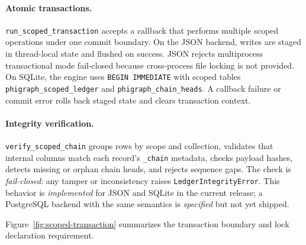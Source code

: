 \documentclass[11pt]{article}
\begin{document}
\paragraph{Atomic transactions.}
\texttt{run\_scoped\_transaction} accepts a callback that performs multiple
scoped operations under one commit boundary. On the JSON backend, writes are
staged in thread-local state and flushed on success. JSON rejects multiprocess
transactional mode fail-closed because cross-process file locking is not
provided. On SQLite, the engine uses \texttt{BEGIN IMMEDIATE} with scoped
tables \texttt{phigraph\_scoped\_ledger} and \texttt{phigraph\_chain\_heads}. A callback failure or commit error rolls
back staged state and clears transaction context.

\paragraph{Integrity verification.}
\texttt{verify\_scoped\_chain} groups rows by scope and collection, validates
that internal columns match each record's \texttt{\_chain} metadata, checks
payload hashes, detects missing or orphan chain heads, and rejects sequence
gaps. The check is \emph{fail-closed}: any tamper or inconsistency raises
\texttt{LedgerIntegrityError}. This behavior is \emph{implemented} for JSON
and SQLite in the current release; a PostgreSQL backend with the same semantics
is \emph{specified} but not yet shipped.

Figure~\ref{fig:scoped-transaction} summarizes the transaction boundary and
lock declaration requirement.
\end{document}

